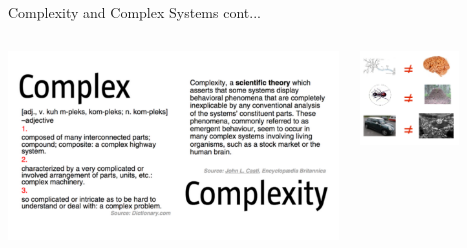 \documentclass{beamer}
\begin{document}
\begin{frame}{Complexity and Complex Systems cont...}
\begin{columns}
	\begin{column}{0.65\textwidth}
		\begin{center}
			\includegraphics[width=1.0\textwidth]{images/complexity.png}
		\end{center}
		
	\end{column}
	\begin{column}{0.45\textwidth} 
		\begin{center}
			\includegraphics[width=0.65\textwidth]{images/systemcomponents.png}
		\end{center}
	\end{column}
\end{columns}
\end{frame}
\end{document}
